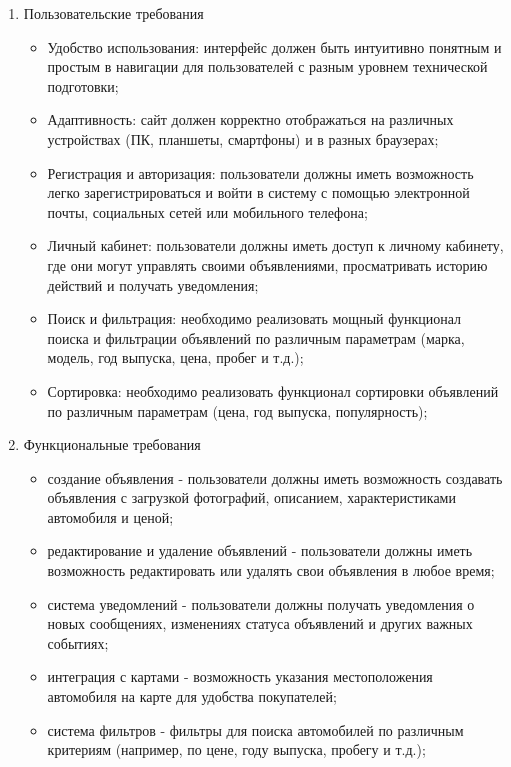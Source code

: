 \begin{enumerate}
    \item Пользовательские требования
        \begin{itemize}
            \item Удобство использования: интерфейс должен быть интуитивно понятным и простым в навигации для пользователей с разным уровнем технической подготовки;
            \item Адаптивность: сайт должен корректно отображаться на различных устройствах (ПК, планшеты, смартфоны) и в разных браузерах;
            \item Регистрация и авторизация: пользователи должны иметь возможность легко зарегистрироваться и войти в систему с помощью электронной почты, социальных сетей или мобильного телефона;
            \item Личный кабинет: пользователи должны иметь доступ к личному кабинету, где они могут управлять своими объявлениями, просматривать историю действий и получать уведомления;
            \item Поиск и фильтрация: необходимо реализовать мощный функционал поиска и фильтрации объявлений по различным параметрам (марка, модель, год выпуска, цена, пробег и т.д.);
            \item Сортировка: необходимо реализовать функционал сортировки объявлений по различным параметрам (цена, год выпуска, популярность);
        \end{itemize}
    \item Функциональные требования
        \begin{itemize}
            \item создание объявления - пользователи должны иметь возможность создавать объявления с загрузкой фотографий, описанием, характеристиками автомобиля и ценой;
            \item редактирование и удаление объявлений - пользователи должны иметь возможность редактировать или удалять свои объявления в любое время;
            \item система уведомлений - пользователи должны получать уведомления о новых сообщениях, изменениях статуса объявлений и других важных событиях;
            \item интеграция с картами - возможность указания местоположения автомобиля на карте для удобства покупателей;
            \item система фильтров - фильтры для поиска автомобилей по различным критериям (например, по цене, году выпуска, пробегу и т.д.);

\end{itemize}
\end{enumerate}
